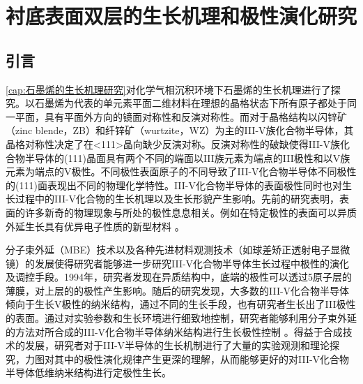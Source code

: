 \chapter{衬底表面双层的生长机理和极性演化研究}
\section{引言}

\ref{cap:石墨烯的生长机理研究}对化学气相沉积环境下石墨烯的生长机理进行了探究。以石墨烯为代表的单元素平面二维材料在理想的晶格状态下所有原子都处于同一平面，具有平面外方向的镜面对称性和反演对称性。而对于晶格结构以闪锌矿（zinc blende，ZB）和纤锌矿（wurtzite，WZ）为主的III-V族化合物半导体，其晶格对称性决定了在<111>晶向缺少反演对称。反演对称性的破缺使得III-V族化合物半导体的(111)晶面具有两个不同的端面\chinesecolon 以III族元素为端点的III极性和以V族元素为端点的V极性。不同极性表面原子的不同导致了III-V化合物半导体不同极性的(111)面表现出不同的物理化学特性。III-V化合物半导体的表面极性同时也对生长过程中的III-V化合物的生长机理以及生长形貌产生影响。先前的研究表明，表面的许多新奇的物理现象与所处的极性息息相关。例如在特定极性的表面可以异质外延生长具有优异电子性质的新型材料 。

分子束外延（MBE）技术以及各种先进材料观测技术（如球差矫正透射电子显微镜）的发展使得研究者能够进一步研究III-V化合物半导体生长过程中极性的演化及调控手段。1994年，研究者发现在异质结构中，底端的极性可以透过5原子层的薄膜，对上层的的极性产生影响。随后的研究发现，大多数的III-V化合物半导体倾向于生长V极性的纳米结构，通过不同的生长手段，也有研究者生长出了III极性的表面。通过对实验参数和生长环境进行细致地控制，研究者能够利用分子束外延的方法对所合成的III-V化合物半导体纳米结构进行生长极性控制 。得益于合成技术的发展，研究者对于III-V半导体的生长机制进行了大量的实验观测和理论探究，力图对其中的极性演化规律产生更深的理解，从而能够更好的对III-V化合物半导体低维纳米结构进行定极性生长。

